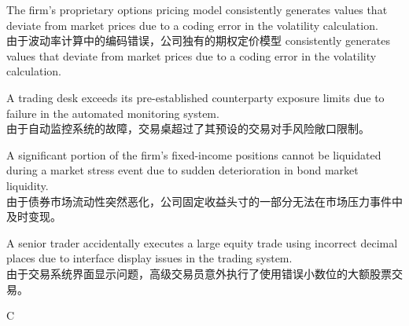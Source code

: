 \documentclass{article}
\begin{document}
\begin{choices}
    \item The firm's proprietary options pricing model consistently generates values that deviate from market prices due to a coding error in the volatility calculation. \\
    由于波动率计算中的编码错误，公司独有的期权定价模型 consistently generates values that deviate from market prices due to a coding error in the volatility calculation.
    
    \item A trading desk exceeds its pre-established counterparty exposure limits due to failure in the automated monitoring system. \\
    由于自动监控系统的故障，交易桌超过了其预设的交易对手风险敞口限制。
    
    \item A significant portion of the firm's fixed-income positions cannot be liquidated during a market stress event due to sudden deterioration in bond market liquidity. \\
    由于债券市场流动性突然恶化，公司固定收益头寸的一部分无法在市场压力事件中及时变现。
    
    \item A senior trader accidentally executes a large equity trade using incorrect decimal places due to interface display issues in the trading system. \\
    由于交易系统界面显示问题，高级交易员意外执行了使用错误小数位的大额股票交易。
\end{choices}

\begin{correctanswer}
    C
\end{correctanswer}
\end{document}
